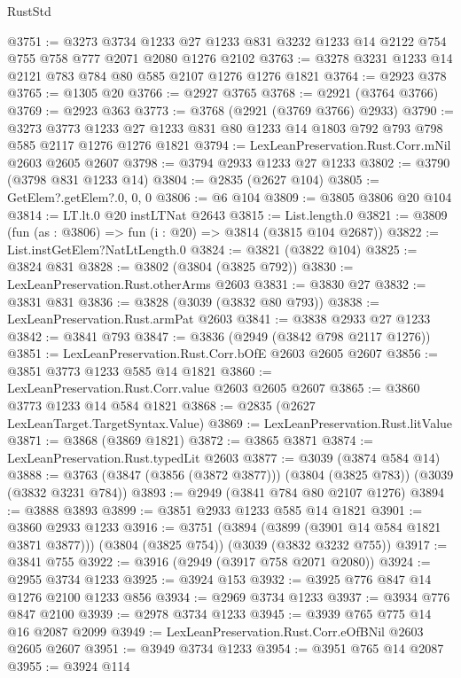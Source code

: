 \begin{lexlean}{RustStd}
\begin{coremodule}
@3751 := @3273
    @3734
    @1233
    @27
    @1233
    @831
    @3232
    @1233
    @14
    @2122
    @754
    @755
    @758
    @777
    @2071
    @2080
    @1276
    @2102
@3763 := @3278 @3231 @1233 @14 @2121 @783 @784 @80 @585 @2107 @1276 @1276 @1821
@3764 := @2923 @378
@3765 := @1305 @20
@3766 := @2927 @3765
@3768 := @2921 (@3764 @3766)
@3769 := @2923 @363
@3773 := @3768 (@2921 (@3769 @3766) @2933)
@3790 := @3273
    @3773
    @1233
    @27
    @1233
    @831
    @80
    @1233
    @14
    @1803
    @792
    @793
    @798
    @585
    @2117
    @1276
    @1276
    @1821
@3794 := LexLeanPreservation.Rust.Corr.mNil @2603 @2605 @2607
@3798 := @3794 @2933 @1233 @27 @1233
@3802 := @3790 (@3798 @831 @1233 @14)
@3804 := @2835 (@2627 @104)
@3805 := GetElem?.getElem?.{0, 0, 0}
@3806 := @6 @104
@3809 := @3805 @3806 @20 @104
@3814 := LT.lt.{0} @20 instLTNat @2643
@3815 := List.length.{0}
@3821 := @3809 (fun (as : @3806) => fun (i : @20) => @3814 (@3815 @104 @2687))
@3822 := List.instGetElem?NatLtLength.{0}
@3824 := @3821 (@3822 @104)
@3825 := @3824 @831
@3828 := @3802 (@3804 (@3825 @792))
@3830 := LexLeanPreservation.Rust.otherArms @2603
@3831 := @3830 @27
@3832 := @3831 @831
@3836 := @3828 (@3039 (@3832 @80 @793))
@3838 := LexLeanPreservation.Rust.armPat @2603
@3841 := @3838 @2933 @27 @1233
@3842 := @3841 @793
@3847 := @3836 (@2949 (@3842 @798 @2117 @1276))
@3851 := LexLeanPreservation.Rust.Corr.bOfE @2603 @2605 @2607
@3856 := @3851 @3773 @1233 @585 @14 @1821
@3860 := LexLeanPreservation.Rust.Corr.value @2603 @2605 @2607
@3865 := @3860 @3773 @1233 @14 @584 @1821
@3868 := @2835 (@2627 LexLeanTarget.TargetSyntax.Value)
@3869 := LexLeanPreservation.Rust.litValue
@3871 := @3868 (@3869 @1821)
@3872 := @3865 @3871
@3874 := LexLeanPreservation.Rust.typedLit @2603
@3877 := @3039 (@3874 @584 @14)
@3888 := @3763 (@3847 (@3856 (@3872 @3877))) (@3804 (@3825 @783)) (@3039 (@3832 @3231 @784))
@3893 := @2949 (@3841 @784 @80 @2107 @1276)
@3894 := @3888 @3893
@3899 := @3851 @2933 @1233 @585 @14 @1821
@3901 := @3860 @2933 @1233
@3916 := @3751
    (@3894 (@3899 (@3901 @14 @584 @1821 @3871 @3877)))
    (@3804 (@3825 @754))
    (@3039 (@3832 @3232 @755))
@3917 := @3841 @755
@3922 := @3916 (@2949 (@3917 @758 @2071 @2080))
@3924 := @2955 @3734 @1233
@3925 := @3924 @153
@3932 := @3925 @776 @847 @14 @1276 @2100 @1233 @856
@3934 := @2969 @3734 @1233
@3937 := @3934 @776 @847 @2100
@3939 := @2978 @3734 @1233
@3945 := @3939 @765 @775 @14 @16 @2087 @2099
@3949 := LexLeanPreservation.Rust.Corr.eOfBNil @2603 @2605 @2607
@3951 := @3949 @3734 @1233
@3954 := @3951 @765 @14 @2087
@3955 := @3924 @114

\end{coremodule}
\end{lexlean}
